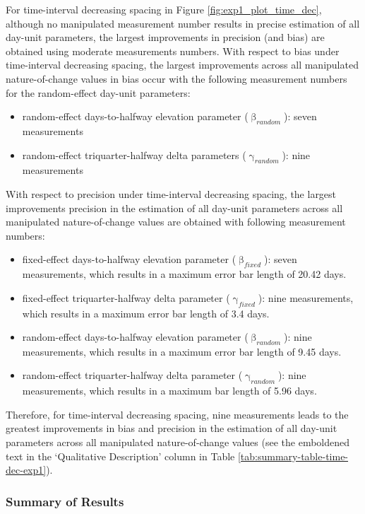 \documentclass[
12pt, %
twoside,
english]{guelphthesis}
\theoremstyle{definition}
\theoremstyle{definition}
\theoremstyle{definition}
\theoremstyle{definition}
\theoremstyle{remark}
\begin{document}
For time-interval decreasing spacing in Figure \ref{fig:exp1_plot_time_dec}, although no manipulated measurement number results in precise estimation of all day-unit parameters, the largest improvements in precision (and bias) are obtained using moderate measurements numbers. With respect to bias under time-interval decreasing spacing, the largest improvements across all manipulated nature-of-change values in bias occur with the following measurement numbers for the random-effect day-unit parameters:
\begin{itemize}
\tightlist
\item
  random-effect days-to-halfway elevation parameter (\(\upbeta_{random}\)): seven measurements
\item
  random-effect triquarter-halfway delta parameters (\(\upgamma_{random}\)): nine measurements
\end{itemize}
\noindent With respect to precision under time-interval decreasing spacing, the largest improvements precision in the estimation of all day-unit parameters across all manipulated nature-of-change values are obtained with following measurement numbers:
\begin{itemize}
\tightlist
\item
  fixed-effect days-to-halfway elevation parameter (\(\upbeta_{fixed}\)): seven measurements, which results in a maximum error bar length of 20.42 days.
\item
  fixed-effect triquarter-halfway delta parameter (\(\upgamma_{fixed}\)): nine measurements, which results in a maximum error bar length of 3.4 days.
\item
  random-effect days-to-halfway elevation parameter (\(\upbeta_{random}\)): nine measurements, which results in a maximum error bar length of 9.45 days.
\item
  random-effect triquarter-halfway delta parameter (\(\upgamma_{random}\)): nine measurements, which results in a maximum bar length of 5.96 days.
\end{itemize}
\noindent Therefore, for time-interval decreasing spacing, nine measurements leads to the greatest improvements in bias and precision in the estimation of all day-unit parameters across all manipulated nature-of-change values (see the emboldened text in the `Qualitative Description' column in Table \ref{tab:summary-table-time-dec-exp1}).

\hypertarget{summary-of-results-2}{%
\subsubsection{Summary of Results}\label{summary-of-results-2}}
\end{document}
